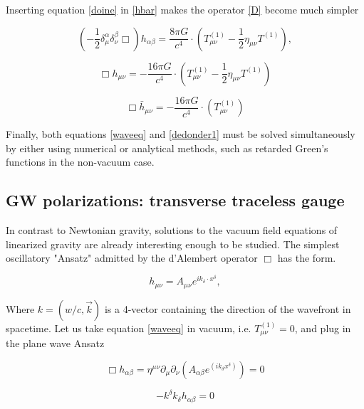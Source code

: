 Inserting equation \ref{doine} in \ref{hbar} makes the operator \ref{D} become much simpler


\begin{equation}\label{waveeq}
\left( -\frac{1}{2} \delta_{\mu}^{\alpha} \delta_{\nu}^{\beta} \Box \right) h_{\alpha \beta} = \frac{8\pi G}{c^4} \cdot (T^{(1)}_{\mu\nu} - \frac{1}{2} \eta_{\mu\nu} T^{(1)}),
\end{equation}


\begin{equation}\label{dedonder1}
\Box h_{\mu\nu} = -\frac{16\pi G}{c^4} \cdot (T^{(1)}_{\mu\nu} - \frac{1}{2} \eta_{\mu\nu} T^{(1)})
\end{equation}

\begin{equation}\label{dedonder2}
\Box \bar{h}_{\mu\nu} = -\frac{16\pi G}{c^4} \cdot (T^{(1)}_{\mu\nu})
\end{equation}
 

Finally, both equations \ref{waveeq} and \ref{dedonder1} must be solved simultaneously by either using numerical or analytical methods, such as retarded Green's functions in the non-vacuum case. 


\subsection{GW polarizations: transverse traceless gauge}

In contrast to Newtonian gravity, solutions to the vacuum field  equations of linearized gravity are already interesting enough to be studied. The simplest oscillatory "Ansatz" admitted by the d'Alembert operator $\Box$ has the form.   

\begin{equation}\label{planew}
h_{\mu\nu} = A_{\mu\nu} e^{i k_{\delta} \cdot x^{\delta}},
\end{equation}

Where $k = (w/c, \vec{k})$ is a 4-vector containing the direction of the wavefront in spacetime. Let us take equation \ref{waveeq} in vacuum, i.e. $T^{(1)}_{\mu \nu} = 0$, and plug in the plane wave Ansatz

\begin{equation}
\Box h_{\alpha \beta} = \eta^{\mu \nu} \partial_{\mu} \partial_{\nu} \left( A_{\alpha \beta} e^{(i k_{\delta} x^{\delta})} \right) = 0 
\end{equation}

\begin{equation}
- k^\delta k_\delta h_{\alpha \beta} = 0 
\end{equation}

